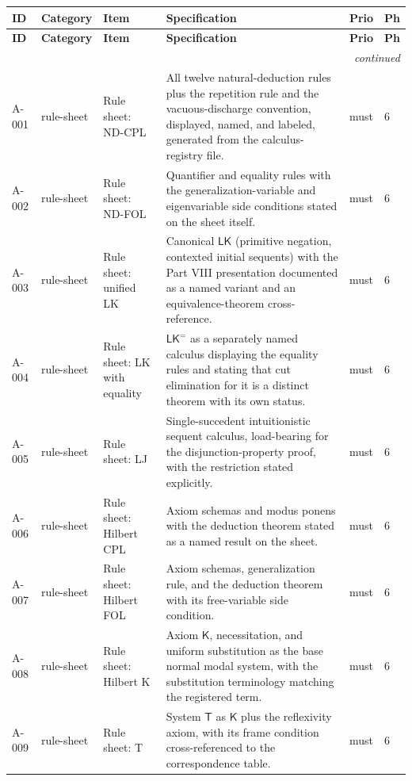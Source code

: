 \begingroup\scriptsize\setlength{\tabcolsep}{3pt}
\begin{longtable}{@{}p{0.45in}p{0.78in}p{2.02in}p{2.6in}p{0.42in}p{0.16in}@{}}
\toprule
\textbf{ID} & \textbf{Category} & \textbf{Item} & \textbf{Specification} & \textbf{Prio} & \textbf{Ph} \\
\midrule
\endfirsthead
\toprule
\textbf{ID} & \textbf{Category} & \textbf{Item} & \textbf{Specification} & \textbf{Prio} & \textbf{Ph} \\
\midrule
\endhead
\midrule\multicolumn{6}{r}{\emph{continued}}\\\endfoot
\bottomrule\endlastfoot
A-001 & rule-sheet & Rule sheet: ND-CPL & All twelve natural-deduction rules plus the repetition rule and the vacuous-discharge convention, displayed, named, and labeled, generated from the calculus-registry file. & must & 6 \\
A-002 & rule-sheet & Rule sheet: ND-FOL & Quantifier and equality rules with the generalization-variable and eigenvariable side conditions stated on the sheet itself. & must & 6 \\
A-003 & rule-sheet & Rule sheet: unified LK & Canonical \(\mathsf{LK}\) (primitive negation, contexted initial sequents) with the Part VIII presentation documented as a named variant and an equivalence-theorem cross-reference. & must & 6 \\
A-004 & rule-sheet & Rule sheet: LK with equality & \(\mathsf{LK}^{=}\) as a separately named calculus displaying the equality rules and stating that cut elimination for it is a distinct theorem with its own status. & must & 6 \\
A-005 & rule-sheet & Rule sheet: LJ & Single-succedent intuitionistic sequent calculus, load-bearing for the disjunction-property proof, with the restriction stated explicitly. & must & 6 \\
A-006 & rule-sheet & Rule sheet: Hilbert CPL & Axiom schemas and modus ponens with the deduction theorem stated as a named result on the sheet. & must & 6 \\
A-007 & rule-sheet & Rule sheet: Hilbert FOL & Axiom schemas, generalization rule, and the deduction theorem with its free-variable side condition. & must & 6 \\
A-008 & rule-sheet & Rule sheet: Hilbert K & Axiom \(\mathsf K\), necessitation, and uniform substitution as the base normal modal system, with the substitution terminology matching the registered term. & must & 6 \\
A-009 & rule-sheet & Rule sheet: T & System \(\mathsf T\) as \(\mathsf K\) plus the reflexivity axiom, with its frame condition cross-referenced to the correspondence table. & must & 6 \\

\end{longtable}
